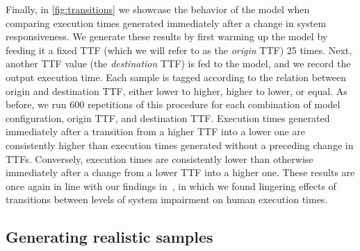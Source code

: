 Finally, in \cref{fig:transitions} we showcase the behavior of the model when comparing execution times generated immediately after a change in system responsiveness.
We generate these results by first warming up the model by feeding it a fixed \ac{TTF} (which we will refer to as the \emph{origin} \ac{TTF}) \num{25} times.
Next, another \ac{TTF} value (the \emph{destination} \ac{TTF}) is fed to the model, and we record the output execution time.
Each sample is tagged according to the relation between origin and destination \ac{TTF}, either lower to higher, higher to lower, or equal.
As before, we run \num{600} repetitions of this procedure for each combination of model configuration, origin \ac{TTF}, and destination \ac{TTF}.
Execution times generated immediately after a transition from a higher \ac{TTF} into a lower one are consistently higher than execution times generated without a preceding change in \acp{TTF}.
Conversely, execution times are consistently lower than otherwise immediately after a change from a lower \ac{TTF} into a higher one.
These results are once again in line with our findings in~\cite{olguinmunoz:impact2021}, in which we found lingering effects of transitions between levels of system impairment on human execution times.


\subsection{Generating realistic samples}\label{ssec:model:frames}

